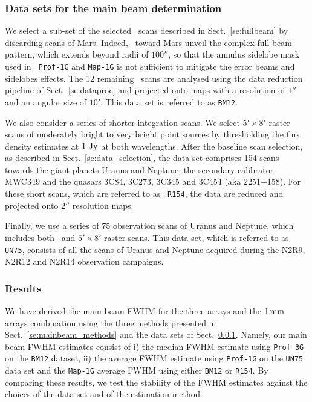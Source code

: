 \subsubsection{Data sets for the main beam determination}
\label{se:mainbeam_dataset}

We select a sub-set of the selected \bm\ scans described in
Sect.~\ref{se:fullbeam} by discarding scans of Mars. {\lp Indeed, \bms\
toward Mars unveil the complex full beam pattern, which extends beyond
radii of $100''$, so that the annulus sidelobe mask used in {\tt
Prof-1G} and {\tt Map-1G} is not sufficient to mitigate the error
beams and sidelobes effects.}
The 12 remaining \bm\ scans are analysed using the data reduction
pipeline of Sect.~\ref{se:dataproc} and projected onto maps
with a resolution of $1''$ and an angular size of $10'$. This data set
is referred to as {\tt BM12}.

We also consider a series of shorter integration scans. We select
$5' \times 8'$ raster scans of moderately bright to very bright point
sources by thresholding the flux density estimates at $1~\rm{Jy}$ at both
wavelengths. %
After the baseline scan selection, as described in
Sect.~\ref{se:data_selection}, the data set comprises 154 %
scans towards the giant planets Uranus and Neptune, the secondary calibrator
MWC349 and the quasars 3C84, 3C273, 3C345 and 3C454 (aka
2251+158). For these short scans, which are referred to as {\tt
R154}, the data are reduced and projected onto $2''$
resolution maps. 

{\lp Finally, we use a series of 75 observation scans of Uranus and
Neptune, which includes both \bm\ and $5' \times 8'$ raster scans. 
This data set, which is referred to as {\tt UN75}, consists of all the
scans of Uranus and Neptune acquired during the N2R9, N2R12 and N2R14
observation campaigns.}


\subsubsection{Results}
\label{se:mainbeam_results}

We have derived the main beam FWHM for the three arrays and the
$1\,\rm{mm}$ arrays combination using the three methods presented in
Sect.~\ref{se:mainbeam_methods} and the data
sets of Sect.~\ref{se:mainbeam_dataset}.
Namely, our main beam FWHM estimates
consist of i) the median FWHM estimate using {\tt Prof-3G} on the
{\tt BM12} dataset, ii) the average FWHM estimate using {\tt Prof-1G}
on the {\tt UN75} data set and the {\tt Map-1G} average FWHM using
either {\tt BM12} or {\tt R154}. 
By comparing these results, we test the stability of the FWHM
estimates against the choices of the data set and of the estimation
method. %

